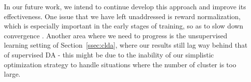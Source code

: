 \documentclass[11pt]{article}
\begin{document}
In our future work, we intend to continue develop this approach and improve its effectiveness. One issue that we have left unaddressed is reward normalization, which is especially important in the early stages of training, so as to slow down convergence \cite{Kumar19reinforcement}. Another area where we need to progress is the unsupervised learning setting of Section~\ref{ssec:clda}, where our results still lag way behind that of supervised DA - this might be due to the inability of our simplistic optimization strategy to handle situations where the number of cluster is too large.



\end{document}
